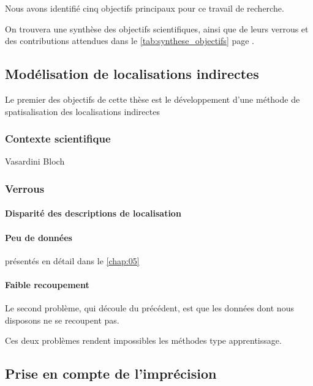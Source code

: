 Nous avons identifié cinq objectifs principaux pour ce travail de
recherche.

On trouvera une synthèse des objectifs scientifiques, ainsi que de
leurs verrous et des contributions attendues dans le
\autoref{tab:synthese_objectifs} page
\pageref{tab:synthese_objectifs}.

\subsection{Modélisation de localisations indirectes}
\label{subsec:2-1-1}

Le premier des objectifs de cette thèse est le développement d'une
méthode de spatisalisation des localisations indirectes

\subsubsection{Contexte scientifique}

Vasardini
Bloch

\subsubsection{Verrous}

\paragraph{Disparité des descriptions de localisation}

\paragraph{Peu de données}

présentés en détail dans le \autoref{chap:05}

\paragraph{Faible recoupement}

Le second problème, qui découle du précédent, est que les données
dont nous disposons ne se recoupent pas.

Ces deux problèmes rendent impossibles les méthodes type
apprentissage.

\subsection{Prise en compte de l'imprécision}
\label{subsec:2-1-2}

